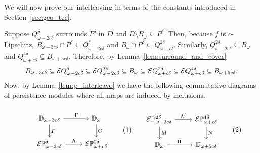 
We will now prove our interleaving in terms of the constants introduced in Section~\ref{sec:geo_tcc}.

Suppose $Q_{\omega-2c\delta}^\delta$ surrounds $P^\delta$ in $D$ and $D\setminus B_\omega\subseteq P^\delta$.%
Then, because $f$ is $c$-Lipschitz, $B_{\omega-3c\delta}\cap P^\delta\subseteq Q_{\omega-2c\delta}^\delta$ and $B_\omega\cap P^\delta\subseteq Q_{\omega+c\delta}^{2\delta}$.
Similarly, $Q_{\omega-2c\delta}^{2\delta}\subseteq B_\omega$ and $Q_{\omega+c\delta}^{4\delta}\subseteq B_{\omega+5c\delta}$.
Therefore, by Lemma~\ref{lem:surround_and_cover}
\[ B_{\omega-3c\delta}\subseteq \mathcal{E} Q_{\omega-2c\delta}^\delta\subseteq\mathcal{E} Q_{\omega-2c\delta}^{2\delta}\subseteq B_\omega
  \subseteq \mathcal{E} Q_{\omega+c\delta}^{2\delta}\subseteq \mathcal{E} Q_{\omega+c\delta}^{4\delta}\subseteq B_{\omega+5c\delta}.\]
%
Now, by Lemma~\ref{lem:p_interleave} we have the following commutative diagrams of persistence modules where all maps are induced by inclusions.\\

\begin{subequations}
  \begin{minipage}{0.45\linewidth}
    \begin{equation}\label{eq:partial_left}
      \begin{tikzcd}
        \DD{\omega-3c\delta} \arrow{r}{\Gamma}\arrow{d}{F} &
        \DD{\omega} \arrow{d}{G}\\
        \E\PP{\omega-2c\delta}{\delta}\arrow{r}{\Lambda} &
        \E\PP{\omega+c\delta}{2\delta}
      \end{tikzcd}
    \end{equation}
  \end{minipage}
  \begin{minipage}{0.45\linewidth}
    \begin{equation}\label{eq:partial_right}
      \begin{tikzcd}
        \E\PP{\omega-2c\delta}{2\delta} \arrow{r}{\Lambda'}\arrow{d}{M} &
        \E\PP{\omega+c\delta}{4\delta}\arrow{d}{N}\\
        \DD{\omega} \arrow{r}{\Pi} &
        \DD{\omega+5c\delta}
      \end{tikzcd}
    \end{equation}
  \end{minipage}
\end{subequations}\vspace{2ex}

